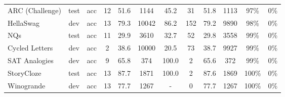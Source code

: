 \documentclass{article}
\begin{document}
\begin{table}
{\begin{adjustwidth}{-1.4in}{-1.4in}
\begin{center}
\begin{tabular}{lccccccccccc}
     ARC (Challenge) &  test &      acc &  12 &        51.6 &                      1144 &                            45.2 &                        31 &                            51.8 &                      1113 &                            97\% &                                                 0\% \\
           HellaSwag &   dev &      acc &  13 &        79.3 &                     10042 &                            86.2 &                       152 &                            79.2 &                      9890 &                            98\% &                                                 0\% \\
                 NQs &  test &      acc &  11 &        29.9 &                      3610 &                            32.7 &                        52 &                            29.8 &                      3558 &                            99\% &                                                 0\% \\
      Cycled Letters &   dev &      acc &   2 &        38.6 &                     10000 &                            20.5 &                        73 &                            38.7 &                      9927 &                            99\% &                                                 0\% \\
       SAT Analogies &   dev &      acc &   9 &        65.8 &                       374 &                           100.0 &                         2 &                            65.6 &                       372 &                            99\% &                                                 0\% \\
          StoryCloze &  test &      acc &  13 &        87.7 &                      1871 &                           100.0 &                         2 &                            87.6 &                      1869 &                           100\% &                                                 0\% \\
          Winogrande &   dev &      acc &  13 &        77.7 &                      1267 &                               - &                         0 &                            77.7 &                      1267 &                           100\% &                                                 0\% \\

\bottomrule
\end{tabular}
    
    \end{center}
    \end{adjustwidth}
    }
    

\end{table}
\end{document}
